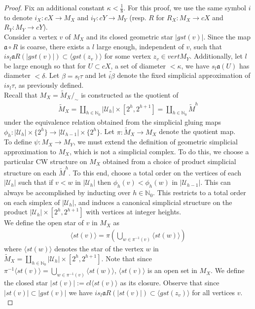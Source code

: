 \documentclass[a4paper,11pt]{article}
\theoremstyle{definition}
\theoremstyle{plain}
\theoremstyle{remark}
\begin{document}
{\begin{proof} Fix an additional constant $\kappa<\frac{1}{8}$. For this proof, we use the same symbol $i$ to denote $i_{X}: cX\rightarrow M_{X}$ and $i_Y: cY\rightarrow M_{Y}$ (resp. $R$ for $R_{X}: M_{X}\rightarrow cX$ and $R_{Y}:M_{Y}\rightarrow cY$). \\

Consider a vertex $v$ of $M_{X}$ and its closed geometric star $|gst(v)|$. Since the map $\mathfrak{a} \circ R$ is coarse, there exists a $l$ large enough, independent of $v$, such that $i s_{l} \mathfrak{a} R(|gst(v)|)\subset \langle gst(z_v) \rangle$ for some vertex $z_v\in vert M_Y$. Additionally, let $l$ be large enough so that for $U\subset cX$, a set of diameter $<\kappa$, we have $s_{l}\mathfrak{a}(U)$ has diameter $<\delta$. Let $\beta = s_{l}\tau$ and let $\widetilde{i\beta}$ denote the fixed simplicial approximation of $is_{l}\tau$, as previously defined. \\

Recall that $M_{X} = \tilde{M}_{X}/_{\sim}$ is constructed as the quotient of 
\begin{align*}
\tilde{M}_{X} = \coprod_{h\in \mathbb{N}_{0}} |\mathcal{U}_{h}| \times [2^h,2^{h+1}] = \coprod_{h\in \mathbb{N}_{0}} \tilde{M}^{h}
\end{align*}
 under the equivalence relation obtained from the simplicial gluing maps $\phi_{h}: |\mathcal{U}_{h}| \times \{2^h\}\rightarrow |\mathcal{U}_{h-1}| \times \{2^{h}\}$. Let $\pi: \tilde{M}_{X}\rightarrow M_{X}$ denote the quotient map.\\

To define $\psi: M_{X}\rightarrow M_{Y}$, we must extend the definition of geometric simplicial approximation to $M_{X}$, which is not a simplicial complex. To do this, we choose a particular CW structure on $M_{X}$ obtained from a choice of product simplicial structure on each $\tilde{M}^{h}$. To this end, choose a total order on the vertices of each $|\mathcal{U}_{h}|$ such that if $v<w$ in $|\mathcal{U}_{h}|$ then $\phi_{h}(v)<\phi_{h}(w)$ in $|\mathcal{U}_{h-1}|$. This can always be accomplished by inducting over $h\in \mathbb{N}_{0}$. This restricts to a total order on each simplex of  $|\mathcal{U}_{h}|$, and induces a canonical simplicial structure on the product $ |\mathcal{U}_{h}| \times [2^h,2^{h+1}]$ with vertices at integer heights. \\

We define the open star of $v$ in $M_{X}$ as  
\begin{align*}
\langle st(v)\rangle = \pi(\bigcup_{w\in \pi^{-1}(v)}\langle st(w)\rangle)
\end{align*}
where $\langle st(w)\rangle$ denotes the star of the vertex $w$ in $\tilde{M}_{X} = \coprod_{h\in \mathbb{N}_0} |\mathcal{U}_{h}| \times [2^h,2^{h+1}]$. Note that since $\pi^{-1} \langle st(v)\rangle = \bigcup_{w\in \pi^{-1}(v)}\langle st(w)\rangle$, $\langle st(v)\rangle$ is an open set in $M_{X}$. We define the closed star $ |st(v)|:= cl\langle st(v)\rangle$ as its closure. Observe that since $|st(v)|\subset |gst(v)|$ we have $i s_{l} \mathfrak{a} R (|st(v)|)\subset \langle gst(z_v) \rangle$ for all vertices $v$. \\


\end{proof}}
\end{document}

